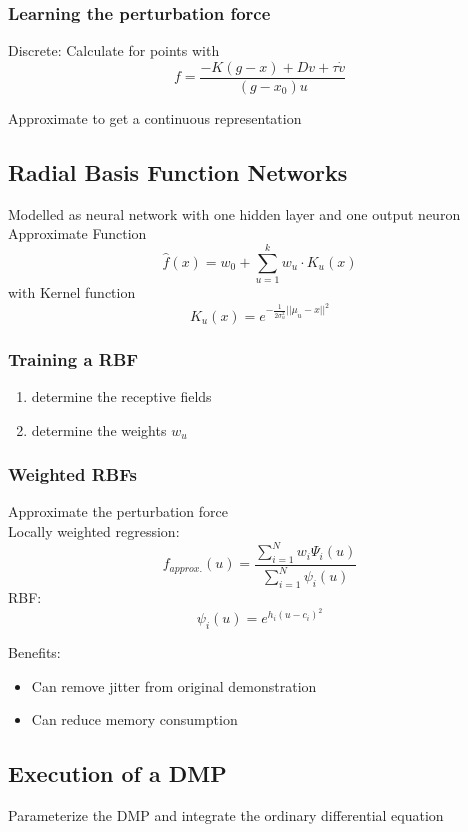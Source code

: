 \subsubsection{Learning the perturbation force}%
\label{ar:ssub:learning_the_perturbation_force}
Discrete: Calculate for points with \[f = \frac{-K(g-x) + Dv + \tau\dot{v}}{(g - x_0)u}\]

Approximate to get a continuous representation

\subsection{Radial Basis Function Networks}%
\label{ar:sub:radial_basis_function_networks}
Modelled as neural network with one hidden layer and one output neuron\\
Approximate Function
\[\hat{f}(x) = w_0 + \sum_{u=1}^k w_u \cdot K_u(x)\]
with Kernel function
\[K_u (x) = e^{-\frac{1}{2\sigma^2_u} || \mu_u - x||^2}\]

\subsubsection{Training a RBF}%
\label{ar:ssub:training_a_rbf}
\begin{enumerate}
\item determine the receptive fields
\item determine the weights \(w_u\)
\end{enumerate}

\subsubsection{Weighted RBFs}%
\label{ar:ssub:weighted_rbfs}
Approximate the perturbation force\\
Locally weighted regression:
\[f_\mathit{approx.}(u) = \frac{\sum_{i=1}^N w_i \Psi_i(u)}{\sum_{i=1}^N \psi_i(u)}\]
RBF:
\[\psi_i(u) = e^{h_i (u-c_i)^2}\]

Benefits:
\begin{itemize}
\item Can remove jitter from original demonstration
\item Can reduce memory consumption
\end{itemize}

\subsection{Execution of a DMP}%
\label{ar:sub:execution_of_a_dmp}
Parameterize the DMP and integrate the ordinary differential equation

